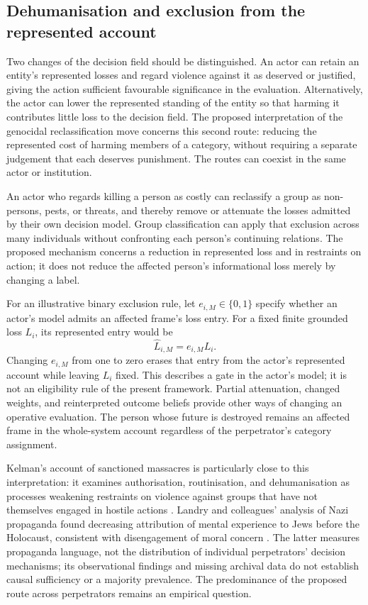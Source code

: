 \documentclass[11pt,a4paper]{article}
\theoremstyle{remark}
\begin{document}
\subsection{Dehumanisation and exclusion from the represented account}

Two changes of the decision field should be distinguished. An actor can retain
an entity's represented losses and regard violence against it as deserved or
justified, giving the action sufficient favourable significance in the evaluation.
Alternatively, the actor can lower the represented standing of the entity so
that harming it contributes little loss to the decision field. The proposed
interpretation of the genocidal reclassification move concerns this second
route: reducing the represented cost of harming members of a category, without
requiring a separate judgement that each deserves punishment. The routes can
coexist in the same actor or institution.

An actor who regards killing a person as costly can reclassify a group
as non-persons, pests, or threats, and thereby remove or attenuate the losses
admitted by their own decision model. Group classification can apply that
exclusion across many individuals without confronting each person's continuing
relations. The proposed mechanism concerns a reduction in represented loss and
in restraints on action; it does not reduce the affected person's informational
loss merely by changing a label.

For an illustrative binary exclusion rule, let $e_{i,M}\in\{0,1\}$ specify whether
an actor's model admits an affected frame's loss entry. For a fixed finite grounded
loss $L_i$, its represented entry would be
\begin{equation}\label{eq:category-exclusion}
\widehat L_{i,M}=e_{i,M}L_i.
\end{equation}
Changing $e_{i,M}$ from one to zero erases that entry from the actor's represented
account while leaving $L_i$ fixed. This describes a gate in the actor's model;
it is not an eligibility rule of the present framework. Partial attenuation,
changed weights, and reinterpreted outcome beliefs provide other ways of
changing an operative evaluation. The person whose future is destroyed remains
an affected frame in the whole-system account regardless of the perpetrator's
category assignment.

Kelman's account of sanctioned massacres is particularly close to this
interpretation: it examines authorisation, routinisation, and dehumanisation
as processes weakening restraints on violence against groups that have not
themselves engaged in hostile actions \citep{kelman1973violence}. Landry and
colleagues' analysis of Nazi propaganda found decreasing attribution of mental
experience to Jews before the Holocaust, consistent with disengagement of moral
concern \citep{landry2022propaganda}. The latter measures propaganda language,
not the distribution of individual perpetrators' decision mechanisms; its
observational findings and missing archival data do not establish causal
sufficiency or a majority prevalence. The predominance of the proposed route
across perpetrators remains an empirical question.
\end{document}
